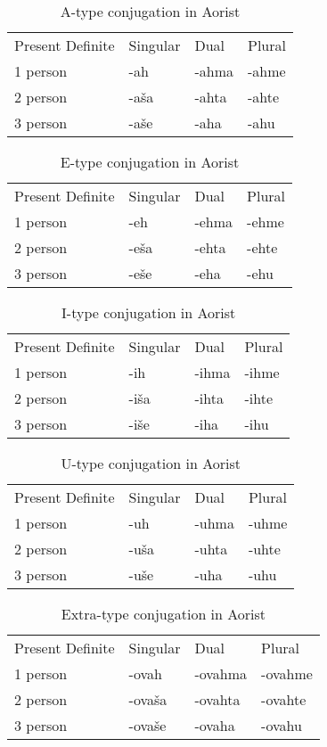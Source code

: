 \begin{table}[!htpb]
	\caption{A-type conjugation in Aorist}
	\begin{tabular}{llll}
		Present Definite & Singular & Dual & Plural \\
		1 person & -ah & -ahma & -ahme \\
		2 person & -aša & -ahta & -ahte \\
		3 person & -aše & -aha & -ahu
	\end{tabular}
\end{table}

\begin{table}[!htpb]
	\caption{E-type conjugation in Aorist}
	\begin{tabular}{llll}
		Present Definite & Singular & Dual & Plural \\
		1 person & -eh & -ehma & -ehme \\
		2 person & -eša & -ehta & -ehte \\
		3 person & -eše & -eha & -ehu
	\end{tabular}
\end{table}

\begin{table}[!htpb]
	\caption{I-type conjugation in Aorist}
	\begin{tabular}{llll}
		Present Definite & Singular & Dual & Plural \\
		1 person & -ih & -ihma & -ihme \\
		2 person & -iša & -ihta & -ihte \\
		3 person & -iše & -iha & -ihu
	\end{tabular}
\end{table}

\begin{table}[!htpb]
	\caption{U-type conjugation in Aorist}
	\begin{tabular}{llll}
		Present Definite & Singular & Dual & Plural \\
		1 person & -uh & -uhma & -uhme \\
		2 person & -uša & -uhta & -uhte \\
		3 person & -uše & -uha & -uhu
	\end{tabular}
\end{table}

\begin{table}[!htpb]
	\caption{Extra-type conjugation in Aorist}
	\begin{tabular}{llll}
		Present Definite & Singular & Dual & Plural \\
		1 person & -ovah & -ovahma & -ovahme \\
		2 person & -ovaša & -ovahta & -ovahte \\
		3 person & -ovaše & -ovaha & -ovahu
	\end{tabular}
\end{table}

